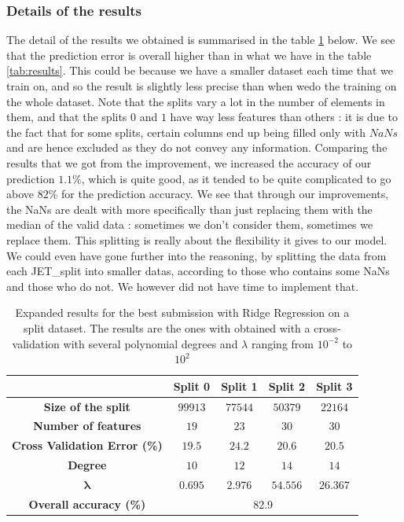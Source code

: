 \documentclass[10pt,conference,compsocconf]{IEEEtran}
\begin{document}
\subsubsection{Details of the results}
The detail of the results we obtained is summarised in the table \ref{tab:RR} below. We see that the prediction error is overall higher than in what we have in the table \ref{tab:results}. This could be because we have a smaller dataset each time that we train on, and so the result is slightly less precise than when wedo the training on the whole dataset. Note that the splits vary a lot in the number of elements in them, and that the splits $0$ and $1$ have way less features than others : it is due to the fact that for some splits, certain columns end up being filled only with $NaNs$ and are hence excluded as they do not convey any information. Comparing the results that we got from the improvement, we increased the accuracy of our prediction $1.1\%$, which is quite good, as it tended to be quite complicated to go above  $82\%$ for the prediction accuracy. We see that through our improvements, the NaNs are dealt with more specifically than just replacing them with the median of the valid data : sometimes we don't consider them, sometimes we replace them. This splitting is really about the flexibility it gives to our model. We could even have gone further into the reasoning, by splitting the data from each JET\_split into smaller datas, according to those who contains some NaNs and those who do not. We however did not have time to implement that.

\begin{table}[!ht]
	\centering
	\begin{tabular}{c||c|c|c|c}
		&\textbf{Split 0} & \textbf{Split 1} & \textbf{Split 2}& \textbf{Split 3}\\
		\hline
		\textbf{Size of the split} & $99913$ & $77544$& $50379$ & $22164$\\
		\hline
		\textbf{Number of features} & $19$ & $23$ & $30$ & $30$ \\
		\hline
		\textbf{Cross Validation Error (\%)} & $19.5$&$24.2$&$20.6$&$20.5$\\
		\hline
		\textbf{Degree} & $10$ & $12$ & $14$ & $14$ \\
		\hline
		{$\mathbf{\lambda}$} & $0.695$ & $2.976$ & $54.556$ & $26.367$\\
		\hline
		\hline
		\textbf{Overall accuracy (\%)} &  \multicolumn{4}{|c}{82.9}
	\end{tabular}
	\caption{Expanded results for the best submission with Ridge Regression on a split dataset. The results are the ones with obtained with a cross-validation with several polynomial degrees and $\lambda$ ranging from $10^{-2}$ to $10^{2}$}
	\label{tab:RR}
\end{table}
\end{document}
